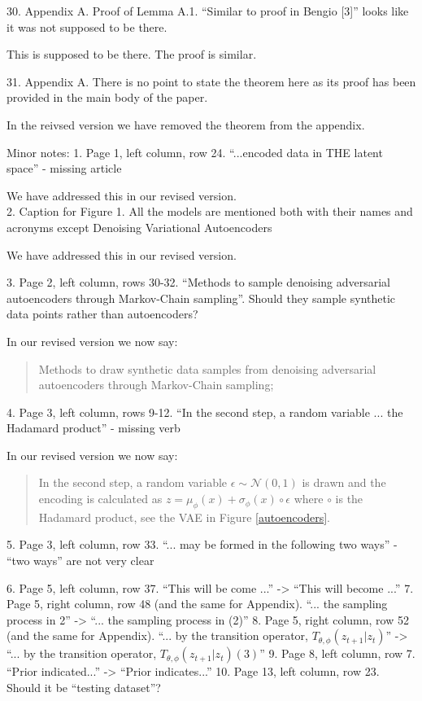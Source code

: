 \documentclass{article}
\begin{document}
{\color{blue}
30. Appendix A. Proof of Lemma A.1. ``Similar to proof in Bengio [3]'' looks like it was not supposed to be there.\\
}

{\color{red} This is supposed to be there. The proof is similar.\\}

{\color{blue}
31. Appendix A. There is no point to state the theorem here as its proof has been provided in the main body of the paper. \\
}

{\color{red} In the reivsed version we have removed the theorem from the appendix.\\}

{\color{blue}
Minor notes:
1. Page 1, left column, row 24. ``...encoded data in THE latent space'' - missing article\\
}

We have addressed this in our revised version.\\ 

{\color{blue}
2. Caption for Figure 1. All the models are mentioned both with their names and acronyms except Denoising Variational Autoencoders
}

We have addressed this in our revised version.

{\color{blue}
3. Page 2, left column, rows 30-32. ``Methods to sample denoising adversarial autoencoders through Markov-Chain sampling''. Should they sample synthetic data points rather than autoencoders?
}

In our revised version we now say:
\begin{quote}
Methods to draw synthetic data samples from denoising adversarial autoencoders through Markov-Chain sampling;
\end{quote}

{\color{blue}
4. Page 3, left column, rows 9-12. ``In the second step, a random variable ... the Hadamard product'' - missing verb
}

In our revised version we now say:
\begin{quote}
In the second step, a random variable $\epsilon \sim \mathcal{N}(0,1)$ is drawn and the encoding is calculated as $z = \mu_\phi(x) + \sigma_\phi(x) \circ \epsilon$ where $\circ$ is the Hadamard product, see the VAE in Figure \ref{autoencoders}.
\end{quote}

{\color{blue}
5. Page 3, left column, row 33. ``... may be formed in the following two ways'' - ``two ways'' are not very clear
}

6. Page 5, left column, row 37. ``This will be come ...'' -> ``This will become ...''
7. Page 5, right column, row 48 (and the same for Appendix). ``... the sampling process in 2'' -> ``... the sampling process in (2)''
8. Page 5, right column, row 52 (and the same for Appendix). ``... by the transition operator, $T_{\theta, \phi}(z_{t+1}|z_t)$'' -> ``... by the transition operator, $T_{\theta, \phi}(z_{t+1}|z_t) (3)$''
9. Page 8, left column, row 7. ``Prior indicated...'' -> ``Prior indicates...''
10. Page 13, left column, row 23. Should it be ``testing dataset''?
\end{document}
